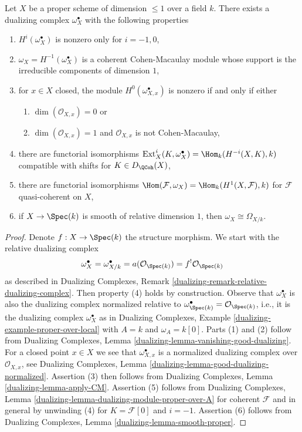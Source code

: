 \begin{lemma}
\label{lemma-duality-dim-1}
Let $X$ be a proper scheme of dimension $\leq 1$ over a field $k$.
There exists a dualizing complex $\omega_X^\bullet$ with the
following properties
\begin{enumerate}
\item $H^i(\omega_X^\bullet)$ is nonzero only for $i = -1, 0$,
\item $\omega_X = H^{-1}(\omega_X^\bullet)$
is a coherent Cohen-Macaulay module whose support is the
irreducible components of dimension $1$,
\item for $x \in X$ closed, the module $H^0(\omega_{X, x}^\bullet)$
is nonzero if and only if either
\begin{enumerate}
\item $\dim(\mathcal{O}_{X, x}) = 0$ or
\item $\dim(\mathcal{O}_{X, x}) = 1$
and $\mathcal{O}_{X, x}$ is not Cohen-Macaulay,
\end{enumerate}
\item there are functorial isomorphisms
$\text{Ext}^i_X(K, \omega_X^\bullet) = \Hom_k(H^{-i}(X, K), k)$
compatible with shifts for $K \in D_\QCoh(X)$,
\item there are functorial isomorphisms
$\Hom(\mathcal{F}, \omega_X) = \Hom_k(H^1(X, \mathcal{F}), k)$
for $\mathcal{F}$ quasi-coherent on $X$,
\item if $X \to \Spec(k)$ is smooth of relative dimension $1$,
then $\omega_X \cong \Omega_{X/k}$.
\end{enumerate}
\end{lemma}

\begin{proof}
Denote $f : X \to \Spec(k)$ the structure morphism.
We start with the relative dualizing complex
$$
\omega_X^\bullet = \omega_{X/k}^\bullet =
a(\mathcal{O}_{\Spec(k)}) = f^!\mathcal{O}_{\Spec(k)}
$$
as described in Dualizing Complexes,
Remark \ref{dualizing-remark-relative-dualizing-complex}.
Then property (4) holds by construction.
Observe that $\omega_X^\bullet$ is also the dualizing complex
normalized relative to
$\omega_{\Spec(k)}^\bullet = \mathcal{O}_{\Spec(k)}$, i.e.,
it is the dualizing complex $\omega_X^\bullet$
as in Dualizing Complexes, Example \ref{dualizing-example-proper-over-local}
with $A = k$ and $\omega_A = k[0]$.
Parts (1) and (2) follow from
Dualizing Complexes, Lemma \ref{dualizing-lemma-vanishing-good-dualizing}.
For a closed point $x \in X$ we see that $\omega_{X, x}^\bullet$ is a
normalized dualizing complex over $\mathcal{O}_{X, x}$, see
Dualizing Complexes, Lemma \ref{dualizing-lemma-good-dualizing-normalized}.
Assertion (3) then follows from
Dualizing Complexes, Lemma \ref{dualizing-lemma-apply-CM}.
Assertion (5) follows from
Dualizing Complexes, Lemma \ref{dualizing-lemma-dualizing-module-proper-over-A}
for coherent $\mathcal{F}$ and in general by unwinding
(4) for $K = \mathcal{F}[0]$ and $i = -1$.
Assertion (6) follows from Dualizing Complexes,
Lemma \ref{dualizing-lemma-smooth-proper}.
\end{proof}

